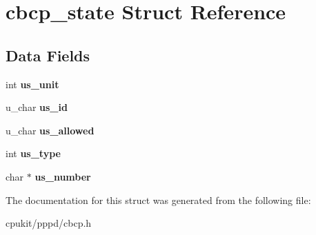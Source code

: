 \hypertarget{structcbcp__state}{}\section{cbcp\+\_\+state Struct Reference}
\label{structcbcp__state}
\subsection*{Data Fields}
\begin{DoxyCompactItemize}
\item 
\mbox{\label{structcbcp__state_a8d1d987a2e1857ab4ba41fd6b9703107}} 
int {\bfseries us\+\_\+unit}
\item 
\mbox{\label{structcbcp__state_a163550353ef302ff4fd8ebaaeb0b3d82}} 
u\+\_\+char {\bfseries us\+\_\+id}
\item 
\mbox{\label{structcbcp__state_a52fc48bb33e2acefed1c2548281b193e}} 
u\+\_\+char {\bfseries us\+\_\+allowed}
\item 
\mbox{\label{structcbcp__state_ad43b7373bed1a829d16cbe2928cc150d}} 
int {\bfseries us\+\_\+type}
\item 
\mbox{\label{structcbcp__state_ae971d34f79bd16a0f7a317d62794188e}} 
char $\ast$ {\bfseries us\+\_\+number}
\end{DoxyCompactItemize}


The documentation for this struct was generated from the following file\+:\begin{DoxyCompactItemize}
\item 
cpukit/pppd/cbcp.\+h\end{DoxyCompactItemize}
